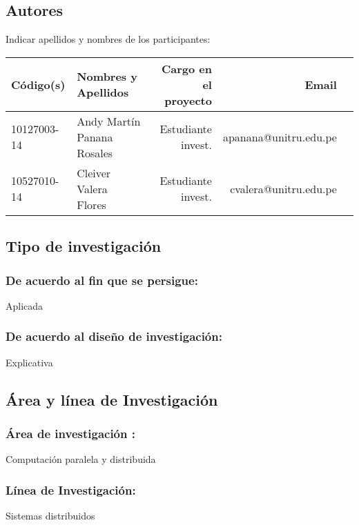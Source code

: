 \subsection{Autores}
Indicar apellidos y nombres de los participantes:
\begin{center}
    \begin{table}[!ht]
    \centering
        \begin{tabular}{llrrr} \toprule
        {\bf Código(s)} & {\bf Nombres y Apellidos} & {\bf Cargo en el proyecto} & {\bf Email} \\ \midrule
        10127003-14 & Andy Martín Panana Rosales & Estudiante invest. & apanana@unitru.edu.pe           \\
        10527010-14    & Cleiver Valera Flores & Estudiante invest. & cvalera@unitru.edu.pe            \\ \bottomrule
        \end{tabular}
    \end{table}
\end{center}

\subsection{Tipo de investigación}
    \subsubsection{De acuerdo al fin que se persigue:} 
    Aplicada
                    
    \subsubsection{De acuerdo al diseño de investigación:} 
    Explicativa

\subsection{Área y línea de Investigación}
    \subsubsection{Área de investigación :} 
    Computación paralela y distribuida
    
    \subsubsection{Línea de Investigación:} 
    Sistemas distribuidos
                
